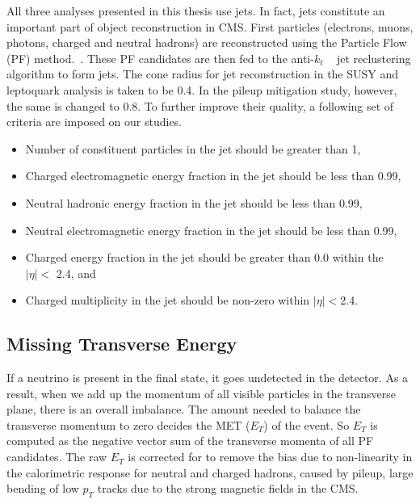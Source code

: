 All three analyses presented in this thesis use jets. In fact, jets constitute an important part of object reconstruction in CMS. First particles 
 (electrons, muons, photons, charged and neutral hadrons) are reconstructed using the Particle Flow (PF) method.~\cite{PFmethod}. These PF candidates are then fed to the anti-$k_{t}$ ~\cite{antiKT} jet reclustering algorithm to form jets. The cone radius for jet reconstruction in the SUSY and leptoquark analysis is taken to be 0.4. In the pileup mitigation study, however, the same is changed to 0.8.  To further improve their quality, a following set of criteria are imposed on our studies.

\begin{itemize}
\item Number of constituent particles in the jet should be greater than 1, \vspace{-0.2in}
\item Charged electromagnetic energy fraction in the jet should be less than 0.99, \vspace{-0.2in}

\item Neutral hadronic energy fraction in the jet should be less than 0.99, \vspace{-0.2in}

\item  Neutral electromagnetic energy fraction in the jet should be less than 0.99, \vspace{-0.2in}

\item Charged energy fraction in the jet should be greater than 0.0 within the $|\eta| < $ 2.4, and \vspace{-0.2in}

\item Charged multiplicity in the jet should be non-zero within $|\eta| < $2.4.\vspace{-0.2in}

\end{itemize}


\subsection{Missing Transverse Energy}

If a neutrino is present in the final state, it goes undetected in the detector. As a result, when we add up the momentum of all visible particles in the transverse plane, there is an overall imbalance. The amount needed to balance the transverse momentum to zero decides the MET ($E_{T}$) of the event. So $E_{T}$ is computed as the negative vector sum of the transverse momenta of all PF candidates. The raw $E_{T}$ is corrected for to remove the bias due to non-linearity in the calorimetric response for neutral and charged hadrons, caused by pileup, large bending of low $p_{T}$ tracks due to the strong magnetic fields in the CMS. 









